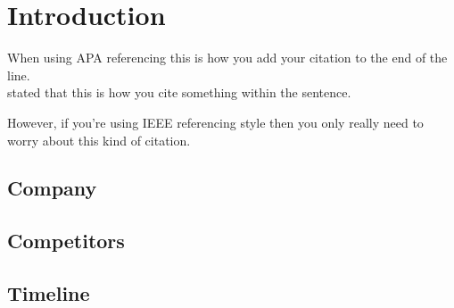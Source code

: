 \section{Introduction}
When using APA referencing this is how you add your citation to the end of the line. \cite[]{Example2023}\\
\cite{Example2023} stated that this is how you cite something within the sentence.\par
However, if you're using IEEE referencing style then you only really need to worry about this kind of citation. \cite{Example2023}

\subsection{Company} %

\subsection{Competitors} %

\subsection{Timeline} %